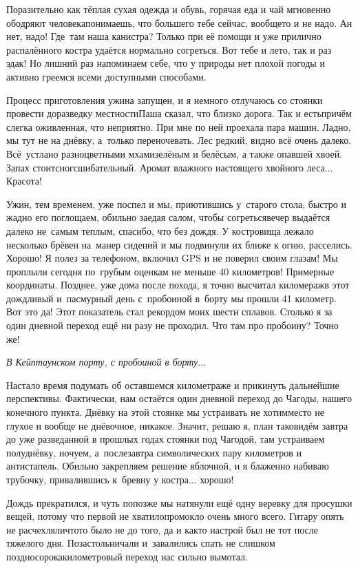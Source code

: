 Поразительно как тёплая сухая одежда и обувь, горячая еда и чай мгновенно ободряют человека\mdash понимаешь, что большего тебе сейчас, вообще\sdash то и не надо. Ан нет, надо! Где~там наша канистра? Только при её помощи и уже прилично распалённого костра удаётся нормально согреться. Вот тебе и лето, так и раз эдак! Но лишний раз напоминаем себе, что у природы нет плохой погоды и активно греемся всеми доступными способами.
 
Процесс приготовления ужина запущен, и я немного отлучаюсь со стоянки провести доразведку местности\mdash Паша сказал, что близко дорога. Так и есть\mdash причём слегка оживленная, что неприятно. При мне по ней проехала пара машин. Ладно, мы тут не на днёвку, а~только переночевать. Лес редкий, видно всё очень далеко. Всё~устлано разноцветными мхами\mdash зелёным и белёсым, а также опавшей хвоей. Запах стоит\mdash сногсшибательный. Аромат влажного настоящего хвойного леса$\ldots$ Красота!

Ужин, тем временем, уже поспел и мы, приютившись у~старого стола, быстро и жадно его поглощаем, обильно заедая салом, чтобы согреться\mdash вечер выдаётся далеко не~самым теплым, спасибо, что без дождя. У костровища лежало несколько брёвен на~манер сидений и мы подвинули их ближе к огню, расселись. Хорошо! Я полез за телефоном, включил GPS и не поверил своим глазам! Мы проплыли сегодня по~грубым оценкам не меньше 40 километров! Примерные координаты\mdash \CoordsLidSeventeenBeforeLast. Позднее, уже дома после похода, я точно высчитал киломераж\mdash в этот дождливый и~пасмурный день с~пробоиной в~борту мы прошли 41 километр. Вот это да! Этот показатель стал рекордом моих шести сплавов. Столько я за один дневной переход ещё ни разу не проходил. Что там про пробоину? Точно же! 

\vspace{0.1cm}
\noindent\textit{%
	\hspace*{1.2cm}В Кейптаунском порту, с пробоиной в борту$\ldots$
}
\vspace{0.1cm}

Настало время подумать об оставшемся километраже и прикинуть дальнейшие перспективы. Фактически, нам остаётся один дневной переход до Чагоды, нашего конечного пункта. Днёвку на этой стоянке мы устраивать не хотим\mdash место не глухое и вообще не днёвочное, никакое. Значит, решаю я, план таков\mdash идём завтра до уже разведанной в прошлых годах стоянки под Чагодой, там устраиваем полуднёвку, ночуем, а~послезавтра символических пару километров и антистапель. Обильно закрепляем решение яблочной, и я блаженно набиваю трубочку, привалившись к~бревну у костра$\ldots$ хорошо! 

Дождь прекратился, и чуть попозже мы натянули ещё одну веревку для просушки вещей, потому что первой не хватило\mdash промокло очень много всего. Гитару опять не расчехляли\mdash что\sdash то было не до того, да и как\sdash то настрой был не тот после тяжелого дня. Позастольничали и~завалились спать не слишком поздно\mdash сорокакилометровый переход нас сильно вымотал.

\begin{center}
\end{center}
